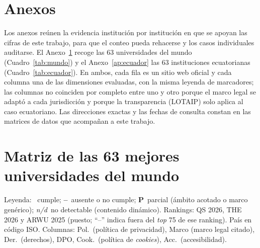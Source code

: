 \documentclass[11pt,a4paper]{article}
\newcommand{\si}{\ding{51}}
\newcommand{\no}{\textcolor{gris}{\textbf{--}}}
\newcommand{\nd}{\textsl{\footnotesize n/d}}
\begin{document}
\appendix
\section*{Anexos}
Los anexos reúnen la evidencia institución por institución en que se apoyan las cifras de este trabajo, para que el conteo pueda rehacerse y los casos individuales auditarse. El Anexo~\ref{ap:mundo} recoge las 63 universidades del mundo (Cuadro~\ref{tab:mundo}) y el Anexo~\ref{ap:ecuador} las 63 instituciones ecuatorianas (Cuadro~\ref{tab:ecuador}). En ambos, cada fila es un sitio web oficial y cada columna una de las dimensiones evaluadas, con la misma leyenda de marcadores; las columnas no coinciden por completo entre uno y otro porque el marco legal se adaptó a cada jurisdicción y porque la transparencia (LOTAIP) solo aplica al caso ecuatoriano. Las direcciones exactas y las fechas de consulta constan en las matrices de datos que acompañan a este trabajo.

\section{Matriz de las 63 mejores universidades del mundo}
\label{ap:mundo}
Leyenda: \si~cumple; \no~ausente o no cumple; \textbf{P}~parcial (\'ambito acotado o marco gen\'erico); \nd~no detectable (contenido din\'amico). Rankings: QS 2026, THE 2026 y ARWU 2025 (puesto; ``--'' indica fuera del \emph{top} 75 de ese ranking). Pa\'is en c\'odigo ISO. Columnas: Pol.\ (pol\'itica de privacidad), Marco (marco legal citado), Der.\ (derechos), DPO, Cook.\ (pol\'itica de \emph{cookies}), Acc.\ (accesibilidad).
\end{document}
